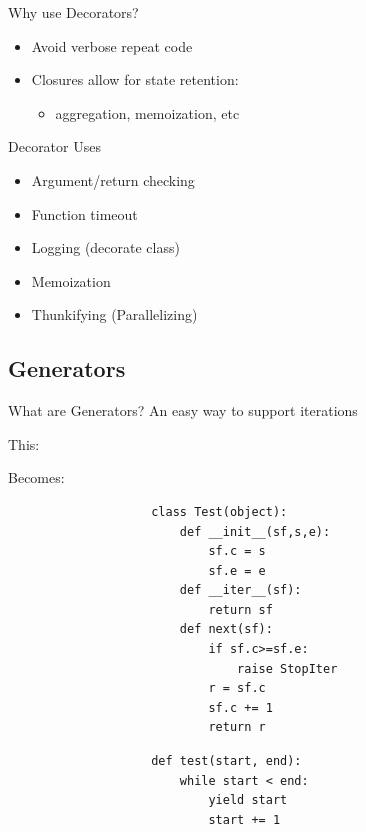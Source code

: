 \documentclass[11pt]{beamer}
\begin{document}
		\begin{frame}[fragile]{Why use Decorators?}
			\begin{itemize}
				\item Avoid verbose repeat code
				\item Closures allow for state retention:
				\begin{itemize}
					\item[] aggregation, memoization, etc
				\end{itemize}
			\end{itemize}
		\end{frame}
		
		\begin{frame}[fragile]{Decorator Uses}
			\begin{itemize}
				\item Argument/return checking
				\item Function timeout
				\item Logging (decorate class)
				\item Memoization
				\item Thunkifying (Parallelizing)
			\end{itemize}
		\end{frame}
	
	\subsection{Generators}
		\begin{frame}[fragile]{What are Generators?}
			An easy way to support iterations \\
			
			\begin{minipage}{0.45\linewidth}
				This:
			\end{minipage}
			\begin{minipage}{0.45\linewidth}
				Becomes:
			\end{minipage}
			
			\begin{minipage}{0.45\linewidth}
				\begin{lstlisting}
					class Test(object):
					    def __init__(sf,s,e):
					        sf.c = s
					        sf.e = e 
					    def __iter__(sf):
					        return sf
					    def next(sf):
					        if sf.c>=sf.e:
					            raise StopIter
					        r = sf.c
					        sf.c += 1
					        return r
				\end{lstlisting}
			\end{minipage}
			\pause
			\begin{minipage}{0.45\linewidth}
				\begin{lstlisting}
					def test(start, end):
					    while start < end:
					        yield start     
					        start += 1
				\end{lstlisting}
			\end{minipage}
		\end{frame}
		
\end{document}
